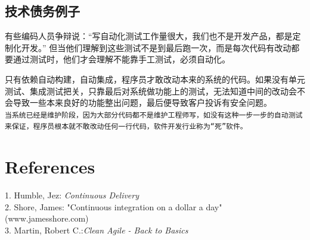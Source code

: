 \begin{description}
\item[]
\end{description}

\hypertarget{ux6280ux672fux503aux52a1ux4f8bux5b50}{%
\subsection{技术债务例子}\label{ux6280ux672fux503aux52a1ux4f8bux5b50}}


有些编码人员争辩说：``写自动化测试工作量很大，我们也不是开发产品，都是定制化开发。''
但当他们理解到这些测试不是到最后跑一次，而是每次代码有改动都要通过测试时，他们才会理解不能靠手工测试，必须自动化。

只有依赖自动构建，自动集成，程序员才敢改动本来的系统的代码。如果没有单元测试、集成测试把关，只靠最后对系统做功能上的测试，无法知道中间的改动会不会导致一些本来良好的功能整出问题，最后便导致客户投诉有安全问题。\\

\texttt{当系统已经是维护阶段，因为大部分代码都不是维护工程师写，如没有这种一步一步的自动测试来保证，程序员根本就不敢改动任何一行代码，软件开发行业称为“死”软件。}~\\

\hypertarget{references}{%
\section{References}\label{references}}

1. Humble, Jez: \emph{Continuous Delivery}\\
2. Shore, James: "Continuous integration on a dollar a day"
(www.jamesshore.com)\\
3. Martin, Robert C.:\emph{Clean Agile - Back to Basics}\\



